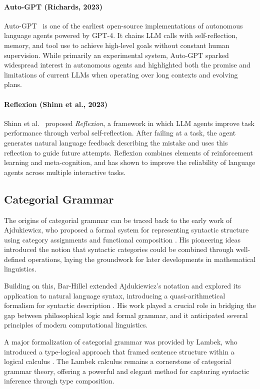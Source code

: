 \paragraph{Auto-GPT (Richards, 2023)}  
Auto-GPT~\cite{torantulino2023autogpt} is one of the earliest open-source implementations of autonomous language agents powered by GPT-4. It chains LLM calls with self-reflection, memory, and tool use to achieve high-level goals without constant human supervision. While primarily an experimental system, Auto-GPT sparked widespread interest in autonomous agents and highlighted both the promise and limitations of current LLMs when operating over long contexts and evolving plans.

\paragraph{Reflexion (Shinn et al., 2023)}  
Shinn et al.~\cite{shinn2023reflexion} proposed \emph{Reflexion}, a framework in which LLM agents improve task performance through verbal self-reflection. After failing at a task, the agent generates natural language feedback describing the mistake and uses this reflection to guide future attempts. Reflexion combines elements of reinforcement learning and meta-cognition, and has shown to improve the reliability of language agents across multiple interactive tasks.


\subsection{Categorial Grammar}

The origins of categorial grammar can be traced back to the early work of Ajdukiewicz, who proposed a formal system for representing syntactic structure using category assignments and functional composition \cite{ajdukiewicz1935syntaktische}. His pioneering ideas introduced the notion that syntactic categories could be combined through well-defined operations, laying the groundwork for later developments in mathematical linguistics.

Building on this, Bar-Hillel extended Ajdukiewicz's notation and explored its application to natural language syntax, introducing a quasi-arithmetical formalism for syntactic description \cite{barhillel1953quasi}. His work played a crucial role in bridging the gap between philosophical logic and formal grammar, and it anticipated several principles of modern computational linguistics.

A major formalization of categorial grammar was provided by Lambek, who introduced a type-logical approach that framed sentence structure within a logical calculus \cite{lambek1958mathematics}. The Lambek calculus remains a cornerstone of categorial grammar theory, offering a powerful and elegant method for capturing syntactic inference through type composition.

